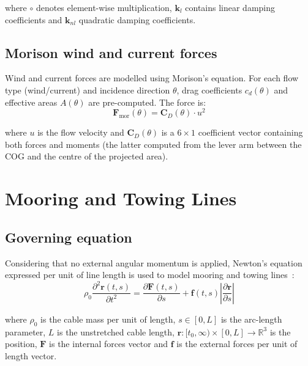 \documentclass[11pt]{article}
\newcommand{\pa}{\partial}
\begin{document}
where $\circ$ denotes element-wise multiplication, $\mathbf{k}_l$ contains linear damping coefficients and $\mathbf{k}_{nl}$ quadratic damping coefficients.

\subsection{Morison wind and current forces}

Wind and current forces are modelled using Morison's equation. For each flow type (wind/current) and incidence direction $\theta$, drag coefficients $c_d(\theta)$ and effective areas $A(\theta)$ are pre-computed. The force is:
\begin{equation}
\mathbf{F}_{\text{mor}}(\theta) = \mathbf{C}_D(\theta)\cdot u^2
\end{equation}

where $u$ is the flow velocity and $\mathbf{C}_D(\theta)$ is a $6\times 1$ coefficient vector containing both forces and moments (the latter computed from the lever arm between the COG and the centre of the projected area).


\section{Mooring and Towing Lines}
\label{sec:lines}

\subsection{Governing equation}

Considering that no external angular momentum is applied, Newton's equation expressed per unit of line length is used to model mooring and towing lines~\cite{Aamo-2000,Rodriguez-2020}:
\begin{equation}
\rho_0\frac{\pa^2\mathbf{r}(t,s)}{\pa t^2} = \frac{\pa\mathbf{F}(t,s)}{\pa s} + \mathbf{f}(t,s)\left|\frac{\pa\mathbf{r}}{\pa s}\right|
\label{eq:line}
\end{equation}

where $\rho_0$ is the cable mass per unit of length, $s\in[0,L]$ is the arc-length parameter, $L$ is the unstretched cable length, $\mathbf{r}:[t_0,\infty)\times[0,L]\to\mathbb{R}^3$ is the position, $\mathbf{F}$ is the internal forces vector and $\mathbf{f}$ is the external forces per unit of length vector.
\end{document}
